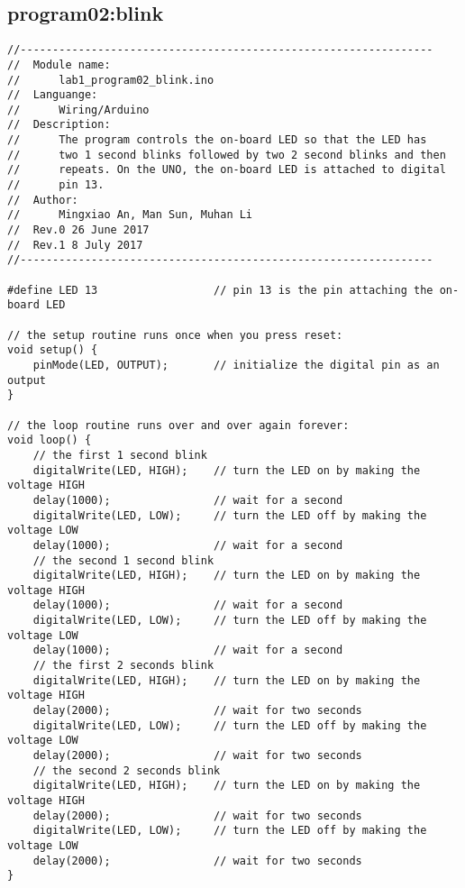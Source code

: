 \subsection{program02:blink}
\begin{verbatim}
//----------------------------------------------------------------
//  Module name:
//      lab1_program02_blink.ino
//  Languange:
//      Wiring/Arduino
//  Description:
//      The program controls the on-board LED so that the LED has 
//      two 1 second blinks followed by two 2 second blinks and then
//      repeats. On the UNO, the on-board LED is attached to digital
//      pin 13.
//  Author:
//      Mingxiao An, Man Sun, Muhan Li
//  Rev.0 26 June 2017
//  Rev.1 8 July 2017
//----------------------------------------------------------------

#define LED 13                  // pin 13 is the pin attaching the on-board LED

// the setup routine runs once when you press reset:
void setup() {
    pinMode(LED, OUTPUT);       // initialize the digital pin as an output
}

// the loop routine runs over and over again forever:
void loop() {
    // the first 1 second blink
    digitalWrite(LED, HIGH);    // turn the LED on by making the voltage HIGH
    delay(1000);                // wait for a second
    digitalWrite(LED, LOW);     // turn the LED off by making the voltage LOW
    delay(1000);                // wait for a second
    // the second 1 second blink
    digitalWrite(LED, HIGH);    // turn the LED on by making the voltage HIGH
    delay(1000);                // wait for a second
    digitalWrite(LED, LOW);     // turn the LED off by making the voltage LOW
    delay(1000);                // wait for a second
    // the first 2 seconds blink
    digitalWrite(LED, HIGH);    // turn the LED on by making the voltage HIGH
    delay(2000);                // wait for two seconds
    digitalWrite(LED, LOW);     // turn the LED off by making the voltage LOW
    delay(2000);                // wait for two seconds
    // the second 2 seconds blink
    digitalWrite(LED, HIGH);    // turn the LED on by making the voltage HIGH
    delay(2000);                // wait for two seconds
    digitalWrite(LED, LOW);     // turn the LED off by making the voltage LOW
    delay(2000);                // wait for two seconds
}
\end{verbatim}

